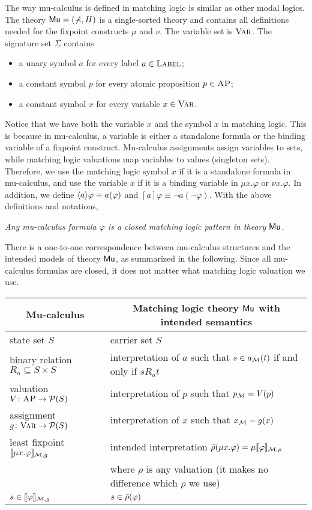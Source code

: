 \documentclass{amsart}
\begin{document}
The way mu-calculus is defined in matching logic is similar
as other modal logics.
The theory $\mathsf{Mu} = (\mathbb{\Sigma}, H)$ is a single-sorted theory and
contains all definitions needed for 
the fixpoint constructs $\mu$ and $\nu$.
The variable set is ${\normalfont\textsc{Var}}$.
The signature set $\Sigma$ contains
\begin{itemize}
\item a unary symbol $a$ for every label $a \in \textsc{Label}$; 
\item a constant symbol $p$ for every atomic proposition $p \in \textsc{AP}$;
\item a constant symbol $x$ for every variable $x \in {\normalfont\textsc{Var}}$.
\end{itemize}
Notice that we have both the variable $x$ and the symbol $x$ in matching logic.
This is because in mu-calculus, a variable is either a standalone formula or
the binding variable of a fixpoint construct.
Mu-calculus assignments assign variables to sets, while matching logic valuations
map variables to values (singleton sets).
Therefore, we use the matching logic symbol $x$ if it is a standalone formula in mu-calculus,
and use the variable $x$ if it is a binding variable in $\mu x . \varphi$ or $\nu x . \varphi$.
In addition, we define $\langle a\rangle\varphi \equiv a(\varphi)$
and $[a]\varphi \equiv \neg a(\neg \varphi)$.
With the above definitions and notations,
\begin{center}
\em
Any mu-calculus formula $\varphi$ is a closed matching logic pattern
in theory $\mathsf{Mu}$.
\end{center}

There is a one-to-one correspondence between
mu-calculus structures and the intended models of theory $\mathsf{Mu}$,
as summarized in the following.
Since all mu-calculus formulas are closed,
it does not matter what matching logic valuation we use.
\begin{center}
\begin{tabular}{ll}
\multicolumn{1}{c}{Mu-calculus} & 
\multicolumn{1}{c}{Matching logic theory $\mathsf{Mu}$ with intended semantics}
\\\hline
state set $S$ & carrier set $S$
\\
binary relation $R_a \subseteq S \times S$ & interpretation of $a$ such that
$s \in a_{\mathcal{M}} (t)$ if and only if $s R_a t$
\\
valuation $V \colon \textsc{AP} \to \mathcal{P}(S)$
& interpretation of $p$ such that $p_{\mathcal{M}} = V(p)$
\\
assignment $g \colon {\normalfont\textsc{Var}} \to \mathcal{P}(S)$
& interpretation of $x$ such that $x_{\mathcal{M}} = g(x)$
\\
least fixpoint $\llbracket\mu x . \varphi\rrbracket_{\mathcal{M},g}$
&
intended interpretation $\bar{\rho}(\mu x . \varphi) = \mu \llbracket\varphi\rrbracket_{\mathcal{M},\rho}$
\\&
where $\rho$ is any valuation (it makes no difference which $\rho$ we use)
\\
$s \in \llbracket\varphi\rrbracket_{\mathcal{M},g}$
& $s \in \bar{\rho}(\varphi)$
\end{tabular}
\end{center}
\end{document}
